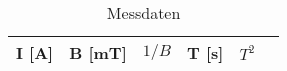 \documentclass[captions=tableheading]{scrartcl}
\begin{document}


\begin{table}
  \centering
  \caption{Messdaten}
  \label{tab:some_data}
  \begin{tabular}{c c c c c c }
    \toprule
     I [A] &		B [mT]	& $1/B$	 & T [s]	& $T^2$\\
    \midrule
      
    \bottomrule
  \end{tabular}
\end{table}

\end{document}
